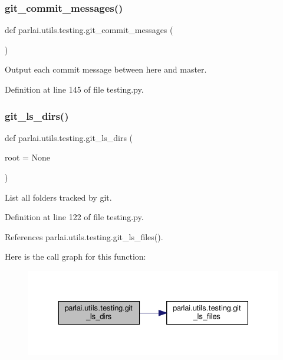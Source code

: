 \subsubsection{\texorpdfstring{git\+\_\+commit\+\_\+messages()}{git\_commit\_messages()}}
{\footnotesize\ttfamily def parlai.\+utils.\+testing.\+git\+\_\+commit\+\_\+messages (\begin{DoxyParamCaption}{ }\end{DoxyParamCaption})}

\begin{DoxyVerb}Output each commit message between here and master.\end{DoxyVerb}
 

Definition at line 145 of file testing.\+py.

\mbox{\label{namespaceparlai_1_1utils_1_1testing_a767a8ac6ea27697e6f782d7375d94933}} 
\subsubsection{\texorpdfstring{git\+\_\+ls\+\_\+dirs()}{git\_ls\_dirs()}}
{\footnotesize\ttfamily def parlai.\+utils.\+testing.\+git\+\_\+ls\+\_\+dirs (\begin{DoxyParamCaption}\item[{}]{root = {\ttfamily None} }\end{DoxyParamCaption})}

\begin{DoxyVerb}List all folders tracked by git.\end{DoxyVerb}
 

Definition at line 122 of file testing.\+py.



References parlai.\+utils.\+testing.\+git\+\_\+ls\+\_\+files().

Here is the call graph for this function\+:
\nopagebreak
\begin{figure}[H]
\begin{center}
\leavevmode
\includegraphics[width=330pt]{namespaceparlai_1_1utils_1_1testing_a767a8ac6ea27697e6f782d7375d94933_cgraph}
\end{center}
\end{figure}
\mbox{\label{namespaceparlai_1_1utils_1_1testing_a50b91b6f209eeedd93ae7ec0e790b121}} 
